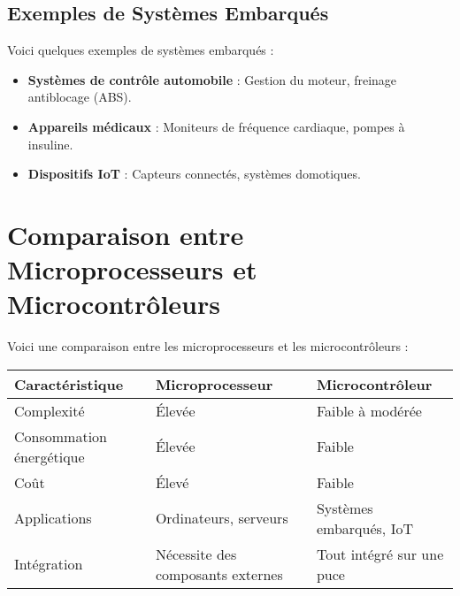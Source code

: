 \documentclass[10pt,a4paper]{article}
\begin{document}

\subsection*{Exemples de Systèmes Embarqués}

Voici quelques exemples de systèmes embarqués :
\begin{itemize}
    \item \textbf{Systèmes de contrôle automobile} : Gestion du moteur, freinage antiblocage (ABS).
    \item \textbf{Appareils médicaux} : Moniteurs de fréquence cardiaque, pompes à insuline.
    \item \textbf{Dispositifs IoT} : Capteurs connectés, systèmes domotiques.
\end{itemize}


\section*{Comparaison entre Microprocesseurs et Microcontrôleurs}

Voici une comparaison entre les microprocesseurs et les microcontrôleurs :

\begin{center}
    \begin{tabular}{|l|l|l|}
    \hline
    \textbf{Caractéristique} & \textbf{Microprocesseur} & \textbf{Microcontrôleur} \\
    \hline
    Complexité & Élevée & Faible à modérée \\
    Consommation énergétique & Élevée & Faible \\
    Coût & Élevé & Faible \\
    Applications & Ordinateurs, serveurs & Systèmes embarqués, IoT \\
    Intégration & Nécessite des composants externes & Tout intégré sur une puce \\
    \hline
    \end{tabular}
\end{center}

\end{document}
